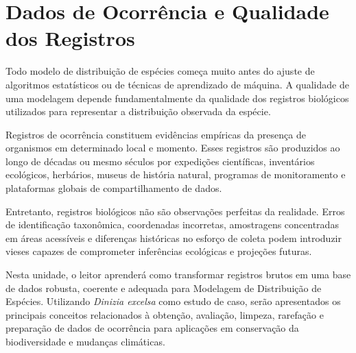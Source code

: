 \chapter{Dados de Ocorrência e Qualidade dos Registros}

\begin{chapteropening}
	
	Todo modelo de distribuição de espécies começa muito antes do ajuste de algoritmos estatísticos ou de técnicas de aprendizado de máquina. A qualidade de uma modelagem depende fundamentalmente da qualidade dos registros biológicos utilizados para representar a distribuição observada da espécie.
	
	Registros de ocorrência constituem evidências empíricas da presença de organismos em determinado local e momento. Esses registros são produzidos ao longo de décadas ou mesmo séculos por expedições científicas, inventários ecológicos, herbários, museus de história natural, programas de monitoramento e plataformas globais de compartilhamento de dados.
	
	Entretanto, registros biológicos não são observações perfeitas da realidade. Erros de identificação taxonômica, coordenadas incorretas, amostragens concentradas em áreas acessíveis e diferenças históricas no esforço de coleta podem introduzir vieses capazes de comprometer inferências ecológicas e projeções futuras.
	
	Nesta unidade, o leitor aprenderá como transformar registros brutos em uma base de dados robusta, coerente e adequada para Modelagem de Distribuição de Espécies. Utilizando \textit{Dinizia excelsa} como estudo de caso, serão apresentados os principais conceitos relacionados à obtenção, avaliação, limpeza, rarefação e preparação de dados de ocorrência para aplicações em conservação da biodiversidade e mudanças climáticas.
	
\end{chapteropening}

